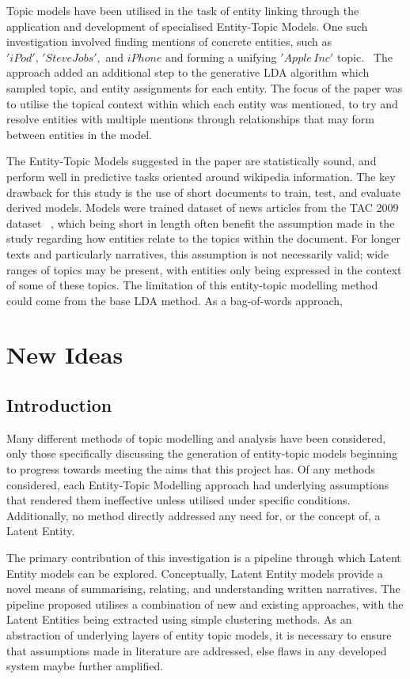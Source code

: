 \documentclass[10pt]{report}
\begin{document}
Topic models have been utilised in the task of entity linking through the application and development of specialised Entity-Topic Models. One such investigation involved finding mentions of concrete entities, such as \('iPod',\, 'Steve Jobs',\) and \(iPhone\) and forming a unifying \('Apple\, Inc'\) topic.~\cite{Han2012-gy} The approach added an additional step to the generative LDA algorithm which sampled topic, and entity assignments for each entity. The focus of the paper was to utilise the topical context within which each entity was mentioned, to try and resolve entities with multiple mentions through relationships that may form between entities in the model.

The Entity-Topic Models suggested in the paper are statistically sound, and perform well in predictive tasks oriented around wikipedia information. The key drawback for this study is the use of short documents to train, test, and evaluate derived models. Models were trained dataset of news articles from the TAC 2009 dataset ~\cite{Macnamee-pd}, which being short in length often benefit the assumption made in the study regarding how entities relate to the topics within the document. For longer texts and particularly narratives, this assumption is not necessarily valid; wide ranges of topics may be present, with entities only being expressed in the context of some of these topics. The limitation of this entity-topic modelling method could come from the base LDA method. As a bag-of-words approach, 


%
%
%
%
\chapter{New Ideas}
\section{Introduction}
Many different methods of topic modelling and analysis have been considered, only those specifically discussing the generation of entity-topic models beginning to progress towards meeting the aims that this project has. Of any methods considered, each Entity-Topic Modelling approach had underlying assumptions that rendered them ineffective unless utilised under specific conditions. Additionally, no method directly addressed any need for, or the concept of, a Latent Entity.

The primary contribution of this investigation is a pipeline through which Latent Entity models can be explored. Conceptually, Latent Entity models provide a novel means of summarising, relating, and understanding written narratives. The pipeline proposed utilises a combination of new and existing approaches, with the Latent Entities being extracted using simple clustering methods. As an abstraction of underlying layers of entity topic models, it is necessary to ensure that assumptions made in literature are addressed, else flaws in any developed system maybe further amplified.
\end{document}
